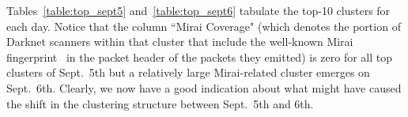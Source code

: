 \documentclass[manuscript, nonacm]{acmart}
\begin{document}
\begin{table}[htb]
    \centering
    \caption{Top-10 clusters for Sept.~6, 2020}
    \footnotesize
    \label{table:top_sept6}
\end{table}

Tables~\ref{table:top_sept5} and~\ref{table:top_sept6} tabulate the top-10 clusters for each day.
Notice that the column ``Mirai Coverage" (which denotes the portion of Darknet scanners within that 
cluster that include the well-known Mirai fingerprint~\cite{MiraiUSENIX2017} in the 
packet header of the packets they emitted) is zero
for all top clusters of Sept.\ 5th but a relatively large Mirai-related cluster emerges on Sept.\ 6th.
Clearly, we now have a good indication about what might have caused the shift in the clustering
structure between Sept.\ 5th and 6th.
\end{document}
